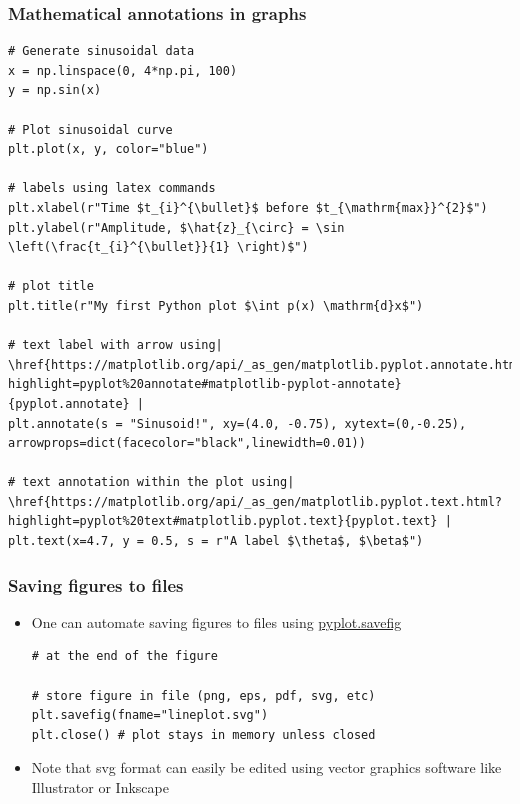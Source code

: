 \documentclass[xcolor=table]{beamer}
\begin{document}
            
\begin{frame}[fragile]
    \tiny
\frametitle{Mathematical annotations in graphs}
            \begin{lstlisting}[style=python]
# Generate sinusoidal data
x = np.linspace(0, 4*np.pi, 100)
y = np.sin(x)

# Plot sinusoidal curve
plt.plot(x, y, color="blue")

# labels using latex commands 
plt.xlabel(r"Time $t_{i}^{\bullet}$ before $t_{\mathrm{max}}^{2}$")
plt.ylabel(r"Amplitude, $\hat{z}_{\circ} = \sin \left(\frac{t_{i}^{\bullet}}{1} \right)$")

# plot title
plt.title(r"My first Python plot $\int p(x) \mathrm{d}x$") 

# text label with arrow using| \href{https://matplotlib.org/api/_as_gen/matplotlib.pyplot.annotate.html?highlight=pyplot%20annotate#matplotlib-pyplot-annotate}{pyplot.annotate} | 
plt.annotate(s = "Sinusoid!", xy=(4.0, -0.75), xytext=(0,-0.25), arrowprops=dict(facecolor="black",linewidth=0.01))

# text annotation within the plot using| \href{https://matplotlib.org/api/_as_gen/matplotlib.pyplot.text.html?highlight=pyplot%20text#matplotlib.pyplot.text}{pyplot.text} |
plt.text(x=4.7, y = 0.5, s = r"A label $\theta$, $\beta$")
\end{lstlisting}
\end{frame}
    

\begin{frame}[fragile]
\frametitle{Saving figures to files}
    \begin{itemize}
        \item One can automate saving figures to files using \href{https://matplotlib.org/api/_as_gen/matplotlib.pyplot.savefig.html?highlight=pyplot%20savefig#matplotlib.pyplot.savefig}{pyplot.savefig}
\begin{lstlisting}[style=python]
# at the end of the figure

# store figure in file (png, eps, pdf, svg, etc)
plt.savefig(fname="lineplot.svg")
plt.close() # plot stays in memory unless closed
\end{lstlisting}
        \item Note that svg format can easily be edited using vector graphics software like Illustrator or Inkscape
    \end{itemize}
\end{frame}
\end{document}
